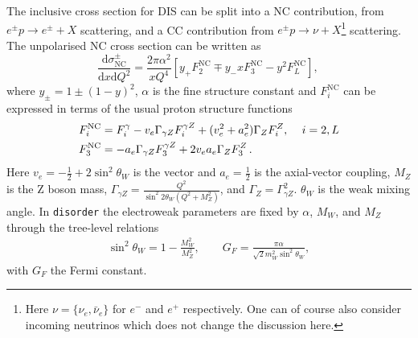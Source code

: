 \documentclass[submission, PhysCodeb]{SciPost}
\newcommand{\disorder}{{\tt disorder}}
\newcommand{\dd}{\mathrm{d}}
\newcommand{\NC}{\mathrm{NC}}
\begin{document}
The inclusive cross section for DIS can be split into a NC
contribution, from $e^\pm p \to e^\pm + X $ scattering, and a CC
contribution from $e^\pm p \to \nu + X$\footnote{Here
$\nu=\{\nu_e,\bar{\nu}_e\}$ for $e^-$ and $e^+$ respectively. One can
of course also consider incoming neutrinos which does not change the
discussion here.} scattering. The unpolarised NC cross section can be
written as
\begin{equation}
\frac{\dd\sigma_{\NC}^\pm}{\dd x \dd Q^2} =   \frac{2\pi\alpha^2}{xQ^4} \left[y_+ F_2^{\NC} \mp y_- x F_3^\NC - y^2 F_L^\NC\right],\,
\label{eq:NCsigma}
\end{equation}
where $y_\pm=1\pm(1-y)^2$, $\alpha$ is the fine structure constant and
$F_i^\NC$ can be expressed in terms of the usual proton structure
functions
\begin{align}
  F_{i}^\NC &= F_{i}^\gamma  - v_e \Gamma_{\gamma Z} F_{i}^{\gamma Z} + (v_e^2 + a_e^2)\Gamma_{Z} F_{i}^{Z},\, \quad i =2,L \\ \notag
  F_{3}^\NC &= - a_e \Gamma_{\gamma Z} F_{3}^{\gamma Z} + 2v_e a_e\Gamma_{Z} F_{3}^{Z}\,.
\end{align}
Here $v_e = -\frac12 + 2 \sin^2\theta_W$ is the vector and
$a_e=\frac12$ is the axial-vector coupling, $M_Z$ is the Z boson mass,
$\Gamma_{\gamma Z} = \frac{Q^2}{\sin^2 2\theta_W(Q^2+M_Z^2)}$, and
$\Gamma_Z=\Gamma_{\gamma Z}^2$. $\theta_W$ is the weak mixing
angle. In \disorder{} the electroweak parameters are fixed by
$\alpha$, $M_W$, and $M_Z$ through the tree-level relations
\begin{align}
  \sin^2\theta_W = 1-\frac{M_W^2}{M_Z^2}, \qquad G_F = \frac{\pi\alpha}{\sqrt{2}m_W^2\sin^2\theta_W},
\end{align}
with $G_F$ the Fermi constant.
\end{document}
